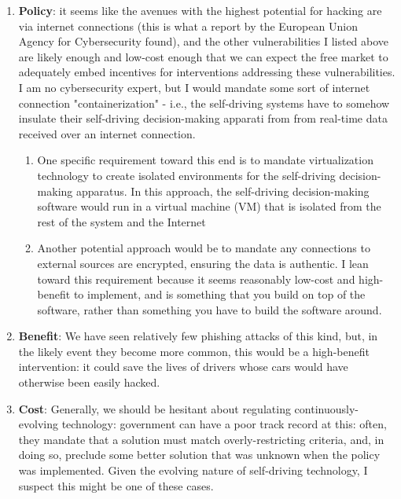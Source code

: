 \documentclass[submit]{harvardml}
\newenvironment{ans}{
  \begin{enumerate}
  \color{blue}
}{
  \end{enumerate}
  \color{black}
}
\begin{document}
\begin{ans}
\begin{enumerate}
        \item \textbf{Policy}: it seems like the avenues with the highest potential for hacking are via internet connections (this is what a report by the European Union Agency for Cybersecurity found), and the other vulnerabilities I listed above are likely enough and low-cost enough that we can expect the free market to adequately embed incentives for interventions addressing these vulnerabilities. I am no cybersecurity expert, but I would mandate some sort of internet connection "containerization" - i.e., the self-driving systems have to somehow insulate their self-driving decision-making apparati from from real-time data received over an internet connection. 
        \begin{enumerate}
            \item One specific requirement toward this end is to mandate virtualization technology to create isolated environments for the self-driving decision-making apparatus. In this approach, the self-driving decision-making software would run in a virtual machine (VM) that is isolated from the rest of the system and the Internet
            \item Another potential approach would be to mandate any connections to external sources are encrypted, ensuring the data is authentic. I lean toward this requirement because it seems reasonably low-cost and high-benefit to implement, and is something that you build on top of the software, rather than something you have to build the software around. 
        \end{enumerate}
        \item \textbf{Benefit}: We have seen relatively few phishing attacks of this kind, but, in the likely event they become more common, this would be a high-benefit intervention: it could save the lives of drivers whose cars would have otherwise been easily hacked. 
        \item \textbf{Cost}: Generally, we should be hesitant about regulating continuously-evolving technology: government can have a poor track record at this: often, they mandate that a solution must match overly-restricting criteria, and, in doing so, preclude some better solution that was unknown when the policy was implemented. Given the evolving nature of self-driving technology, I suspect this might be one of these cases. 
    \end{enumerate}
\end{ans}
\

\newpage
\end{document}
